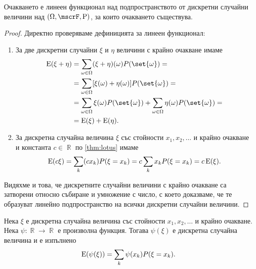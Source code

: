 \documentclass{../../common/topic}
\begin{document}
\begin{proposition}\label{thm:expectation_is_linear_linear}
  Очакването е линеен функционал над подпространството от дискретни случайни величини над \( (\Omega, \mscrF, \Prob) \), за които очакването съществува.
\end{proposition}
\begin{proof}
  Директно проверяваме дефиницията за линеен функционал:
  \begin{enumerate}
    \item За две дискретни случайни \( \xi \) и \( \eta \) величини с крайно очакване имаме
    \begin{align*}
      \Expect(\xi + \eta)
      &=
      \sum_{\omega \in \Omega} (\xi + \eta) (\omega) P(\set{ \omega })
      = \\ &=
      \sum_{\omega \in \Omega} [\xi (\omega) + \eta (\omega)] P(\set{ \omega })
      = \\ &=
      \sum_{\omega \in \Omega} \xi (\omega) P(\set{ \omega }) + \sum_{\omega \in \Omega} \eta (\omega) P(\set{ \omega })
      = \\ &=
      \Expect(\xi) + \Expect(\eta).
    \end{align*}

    \item За дискретна случайна величина \( \xi \) със стойности \( x_1, x_2, \ldots \) и крайно очакване и константа \( c \in \BbbR \) по \cref{thm:lotus} имаме
    \begin{equation*}
      \operatorname{E}(c \xi)
      =
      \sum_k (c x_k) P(\xi = x_k)
      =
      c \sum_k x_k P(\xi = x_k)
      =
      c \operatorname{E}(\xi).
    \end{equation*}
  \end{enumerate}

  Видяхме и това, че дискретните случайни величини с крайно очакване са затворени относно събиране и умножение с число, с което доказваме, че те образуват линейно подпространство на всички дискретни случайни величини.
\end{proof}

\begin{proposition}\label{thm:lotus}
  Нека \( \xi \) е дискретна случайна величина със стойности \( x_1, x_2, \ldots \) и крайно очакване. Нека \( \psi: \BbbR \to \BbbR \) е произволна функция. Тогава \( \psi(\xi) \) е дискретна случайна величина и е изпълнено
  \begin{equation*}
    \operatorname{E}(\psi(\xi))
    =
    \sum_k \psi(x_k) P(\xi = x_k).
  \end{equation*}
\end{proposition}
\end{document}
